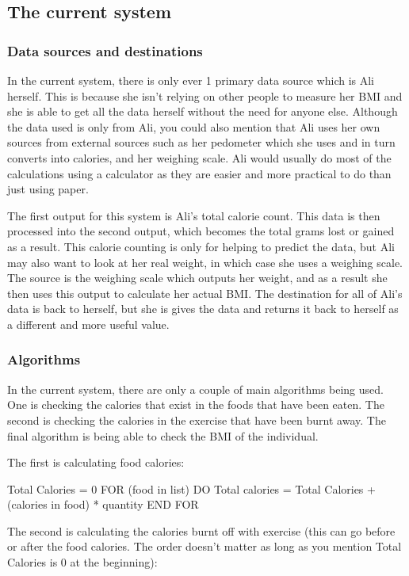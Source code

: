 \subsection{The current system}

\subsubsection{Data sources and destinations}
In the current system, there is only ever 1 primary data source which is Ali herself. This is because she isn't relying on other people to measure her BMI and she is able to get all the data herself without the need for anyone else. Although the data used is only from Ali, you could also mention that Ali uses her own sources from external sources such as her pedometer which she uses and in turn converts into calories, and her weighing scale. Ali would usually do most of the calculations using a calculator as they are easier and more practical to do than just using paper.

The first output for this system is Ali's total calorie count. This data is then processed into the second output, which becomes the total grams lost or gained as a result. This calorie counting is only for helping to predict the data, but Ali may also want to look at her real weight, in which case she uses a weighing scale. The source is the weighing scale which outputs her weight, and as a result she then uses this output to calculate her actual BMI. The destination for all of Ali's data is back to herself, but she is gives the data and returns it back to herself as a different and more useful value.


\subsubsection{Algorithms}
In the current system, there are only a couple of main algorithms being used. One is checking the calories that exist in the foods that have been eaten. The second is checking the calories in the exercise that have been burnt away. The final algorithm is being able to check the BMI of the individual.

The first is calculating food calories:

Total Calories = 0
FOR (food in list) DO
	Total calories = Total Calories + (calories in food) * quantity
END FOR

The second is calculating the calories burnt off with exercise (this can go before or after the food calories. The order doesn't matter as long as you mention Total Calories is 0 at the beginning):

